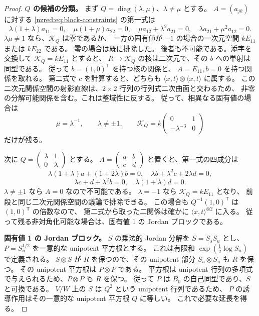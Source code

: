 \documentclass[11pt,a4paper]{ltjsarticle}
\theoremstyle{definition}
\begin{document}
\begin{proof}
\par\smallskip\noindent\textbf{$Q$ の候補の分類。}\quad
まず $Q=\operatorname{diag}(\lambda,\mu)$、$\lambda\ne\mu$ とする。
$A=(a_{jk})$ に対する \eqref{nzred:eq:block-constraints} の第一式は
\[
\lambda(1+\lambda)a_{11}=0,\quad
\mu(1+\mu)a_{22}=0,\quad
\mu a_{12}+\lambda^2a_{21}=0,\quad
\lambda a_{21}+\mu^2a_{12}=0.
\]
$\lambda\mu\ne1$ なら、$\mathcal K_Q$ は零であるか、
一方の固有値が $-1$ の場合の一次元空間 $kE_{11}$ または $kE_{22}$ である。
零の場合は既に排除した。
後者も不可能である。添字を交換して $\mathcal K_Q=kE_{11}$ とすると、
$R\to\mathcal K_Q$ の核は二次元で、その $b$ への単射は同型である。
従って $b=(1,0)^{\mathsf T}$ を持つ核の関係と、
$A=E_{11},b=0$ を持つ関係を取れる。
第二式で $c$ を計算すると、どちらも
$\langle x,t\rangle\otimes\langle x,t\rangle$ に属する。
この二次元関係空間の射影直線は、$2\times2$ 行列の行列式二次曲面と交わるため、
非零の分解可能関係を含む。これは整域性に反する。
従って、相異なる固有値の場合は
\begin{equation}\label{nzred:eq:reciprocal}
\mu=\lambda^{-1},\qquad\lambda\ne\pm1,
\qquad
\mathcal K_Q=k\begin{pmatrix}0&1\\-\lambda^{-3}&0\end{pmatrix}
\end{equation}
だけが残る。

次に $Q=\left(\begin{smallmatrix}\lambda&1\\0&\lambda\end{smallmatrix}\right)$ とする。
$A=\left(\begin{smallmatrix}a&b\\c&d\end{smallmatrix}\right)$ と置くと、第一式の四成分は
\[
\lambda(1+\lambda)a+(1+2\lambda)b=0,\quad
\lambda b+\lambda^2c+2\lambda d=0,
\]
\[
\lambda c+d+\lambda^2b=0,\quad
\lambda(1+\lambda)d=0.
\]
$\lambda\ne\pm1$ なら $A=0$ なので不可能である。
$\lambda=-1$ なら $\mathcal K_Q=kE_{11}$ となり、
前段と同じ二次元関係空間の議論で排除できる。
この場合も $Q^{-1}(1,0)^{\mathsf T}$ は $(1,0)^{\mathsf T}$ の倍数なので、
第二式から取った二関係は確かに $\langle x,t\rangle^{\otimes2}$ に入る。
従って残る非対角化可能な場合は、固有値 1 の Jordan ブロックである。

\par\smallskip\noindent\textbf{固有値 1 の Jordan ブロック。}\quad
$S$ の乗法的 Jordan 分解を $S=S_sS_u$ とし、
$P=S_u^{1/2}$ を一意的な unipotent 平方根とする。
これは有限和 $\exp(\tfrac12\log S_u)$ で定義される。
$S\otimes S$ が $R$ を保つので、その unipotent 部分
$S_u\otimes S_u$ も $R$ を保つ。
その unipotent 平方根は $P\otimes P$ である。
平方根は unipotent 行列の多項式で与えられるため、$P\otimes P$ も $R$ を保つ。
従って $P$ は $B_0$ の自己同型であり、$S$ と可換である。
$V/W$ 上の $S$ は $Q^2$ という unipotent 行列であるため、
$P$ の誘導作用はその一意的な unipotent 平方根 $Q$ に等しい。
これで必要な延長を得る。


\end{proof}
\end{document}
